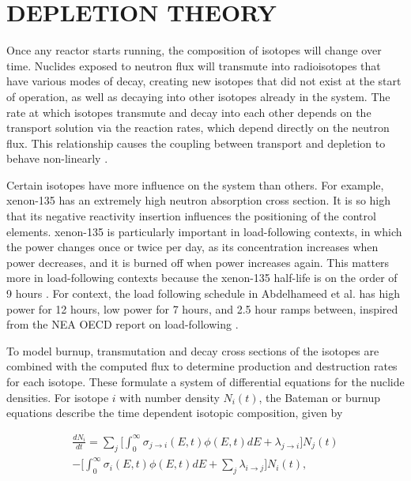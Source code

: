 \documentclass[letterpaper]{physor2024}
\begin{document}
\section{DEPLETION THEORY}\label{sec:depletion}
Once any reactor starts running, the composition of isotopes will change over time. Nuclides exposed to neutron flux will transmute into radioisotopes that have various modes of decay, creating new isotopes that did not exist at the start of operation, as well as decaying into other isotopes already in the system. The rate at which isotopes transmute and decay into each other depends on the transport solution via the reaction rates, which depend directly on the neutron flux. This relationship causes the coupling between transport and depletion to behave non-linearly \cite{romano-depletion-2021}.

Certain isotopes have more influence on the system than others. For example, xenon-135 has an extremely high neutron absorption cross section. It is so high that its negative reactivity insertion influences the positioning of the control elements. xenon-135 is particularly important in load-following contexts, in which the power changes once or twice per day, as its concentration increases when power decreases, and it is burned off when power increases again. This matters more in load-following contexts because the xenon-135 half-life is on the order of 9 hours \cite{d-and-h}. For context, the load following schedule in Abdelhameed et al. has high power for 12 hours, low power for 7 hours, and 2.5 hour ramps between, inspired from the NEA OECD report on load-following \cite{Abdelhameed-ANS-2022,nea-oecd-LF}.

To model burnup, transmutation and decay cross sections of the isotopes are combined with the computed flux to determine production and destruction rates for each isotope. These formulate a system of differential equations for the nuclide densities. For isotope $i$ with number density $N_{i}(t)$, the Bateman or burnup equations describe the time dependent isotopic composition, given by

\begin{multline} \label{eq:batemen}
    \frac{dN_{i}}{dt} =
    \sum_{j} \bigg[\int_{0}^{\infty} \sigma_{j\rightarrow{i}}(E,t)\phi(E,t)dE + \lambda_{j\rightarrow{i}}\bigg]N_{j}(t) \\
    -\bigg[\int_{0}^{\infty} \sigma_{i}(E,t)\phi(E,t)dE
    +\sum_{j}\lambda_{i\rightarrow{j}}\bigg] N_{i}(t),
\end{multline}
\end{document}
